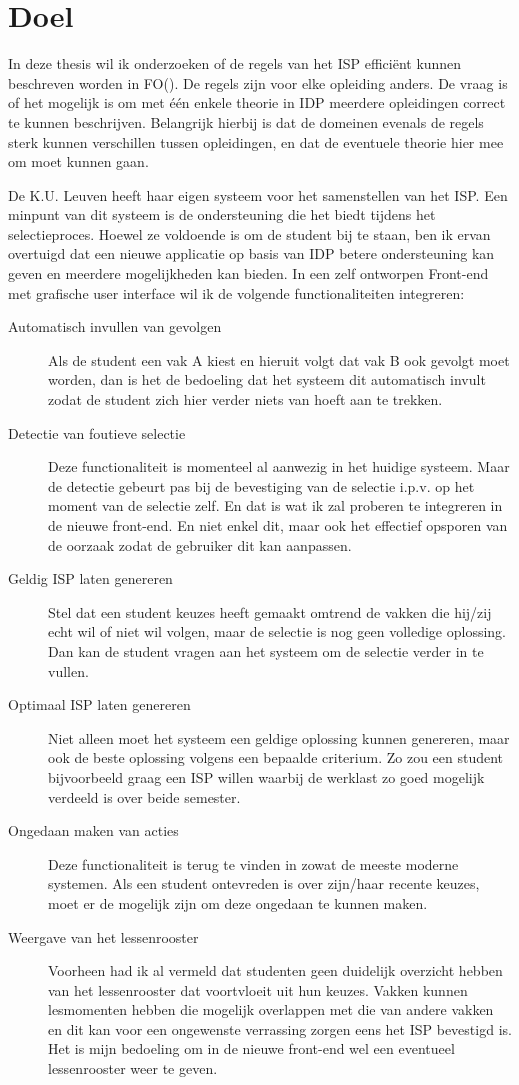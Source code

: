 \section{Doel}
In deze thesis wil ik onderzoeken of de regels van het ISP effici\"{e}nt kunnen beschreven worden in FO(\textperiodcentered). De regels zijn voor elke opleiding anders. De vraag is of het mogelijk is om met \'{e}\'{e}n enkele theorie in IDP meerdere opleidingen correct te kunnen beschrijven. Belangrijk hierbij is dat de domeinen evenals de regels sterk kunnen verschillen tussen opleidingen, en dat de eventuele theorie hier mee om moet kunnen gaan. 

De K.U. Leuven heeft haar eigen systeem voor het samenstellen van het ISP. Een minpunt van dit systeem is de ondersteuning die het biedt tijdens het selectieproces. Hoewel ze voldoende is om de student bij te staan, ben ik ervan overtuigd dat een nieuwe applicatie op basis van IDP betere ondersteuning kan geven en meerdere mogelijkheden kan bieden. In een zelf ontworpen Front-end met grafische user interface wil ik de volgende functionaliteiten integreren:
\begin{description}
\item[Automatisch invullen van gevolgen] Als de student een vak A kiest en hieruit volgt dat vak B ook gevolgt moet worden, dan is het de bedoeling dat het systeem dit automatisch invult zodat de student zich hier verder niets van hoeft aan te trekken. 
\item[Detectie van foutieve selectie] Deze functionaliteit is momenteel al aanwezig in het huidige systeem. Maar de detectie gebeurt pas bij de bevestiging van de selectie i.p.v. op het moment van de selectie zelf. En dat is wat ik zal proberen te integreren in de nieuwe front-end. En niet enkel dit, maar ook het effectief opsporen van de oorzaak zodat de gebruiker dit kan aanpassen.
\item[Geldig ISP laten genereren] Stel dat een student keuzes heeft gemaakt omtrend de vakken die hij/zij echt wil of niet wil volgen, maar de selectie is nog geen volledige oplossing. Dan kan de student vragen aan het systeem om de selectie verder in te vullen.
\item[Optimaal ISP laten genereren] Niet alleen moet het systeem een geldige oplossing kunnen genereren, maar ook de beste oplossing volgens een bepaalde criterium. Zo zou een student bijvoorbeeld graag een ISP willen waarbij de werklast zo goed mogelijk verdeeld is over beide semester. 
\item[Ongedaan maken van acties] Deze functionaliteit is terug te vinden in zowat de meeste moderne systemen. Als een student ontevreden is over zijn/haar recente keuzes, moet er de mogelijk zijn om deze ongedaan te kunnen maken. 
\item[Weergave van het lessenrooster] Voorheen had ik al vermeld dat studenten geen duidelijk overzicht hebben van het lessenrooster dat voortvloeit uit hun keuzes. Vakken kunnen lesmomenten hebben die mogelijk overlappen met die van andere vakken en dit kan voor een ongewenste verrassing zorgen eens het ISP bevestigd is. Het is mijn bedoeling om in de nieuwe front-end wel een eventueel lessenrooster weer te geven.
\end{description}
